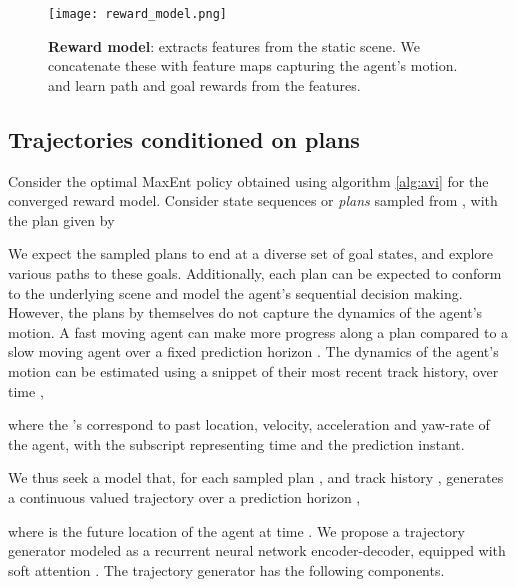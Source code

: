 \documentclass[journal]{IEEEtran}
\begin{document}
\begin{figure}[t]
\centering
\texttt{[image: reward\_model.png]}
\caption{\textbf{Reward model}:  extracts features from the static scene. We concatenate these with feature maps capturing the agent's motion.  and  learn path and goal rewards from the features.}
\label{fig:reward_model}
\end{figure}


\subsection{Trajectories conditioned on plans}\label{sec:traj_gen}

Consider the optimal MaxEnt policy  obtained using algorithm \ref{alg:avi} for the converged reward model. Consider state sequences or \textit{plans} sampled from , with the  plan given by

We expect the sampled plans to end at a diverse set of goal states, and explore various paths to these goals. Additionally, each plan  can be expected to conform to the underlying scene and model the agent's sequential decision making. However, the plans by themselves do not capture the dynamics of the agent's motion. A fast moving agent can make more progress along a plan compared to a slow moving agent over a fixed prediction horizon . The dynamics of the agent's motion can be estimated using a snippet of their most recent track history, over time ,

where the 's correspond to past location, velocity, acceleration and yaw-rate of the agent, with the subscript  representing time and  the prediction instant.  


We thus seek a model that, for each sampled plan , and track history , generates a continuous valued trajectory  over a prediction horizon ,

where  is the future location of the agent at time . We propose a trajectory generator modeled as a recurrent neural network encoder-decoder, equipped with soft attention \cite{bahdanau2014neural}. The trajectory generator has the following components.
\end{document}
